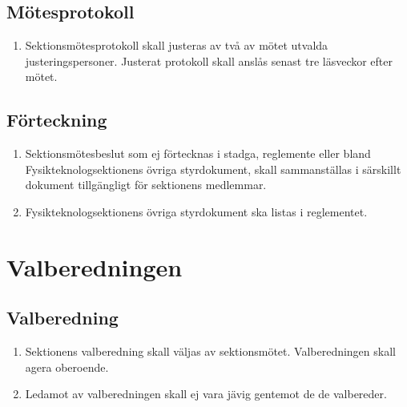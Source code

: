 \documentclass[11pt,a4paper]{article}
\begin{document}
\subsection{Mötesprotokoll}

\begin{enumerate}[\thesubsection.1]

  \item Sektionsmötesprotokoll skall justeras av två av mötet utvalda
  justeringspersoner. Justerat protokoll skall anslås senast tre
  läsveckor efter mötet.

\end{enumerate}


\subsection{Förteckning}

\begin{enumerate}[\thesubsection.1]

  \item Sektionsmötesbeslut som ej förtecknas i stadga, reglemente eller bland Fysikteknologsektionens övriga styrdokument, skall sammanställas i särskillt dokument tillgängligt för sektionens medlemmar.

\item Fysikteknologsektionens övriga styrdokument ska listas i reglementet.
\end{enumerate}

\newpage



\section{Valberedningen}

\subsection{Valberedning}

\begin{enumerate}[\thesubsection.1]

  \item Sektionens valberedning skall väljas av sektionsmötet. Valberedningen skall agera oberoende.
  
  \item Ledamot av valberedningen skall ej vara jävig gentemot de de valbereder.

\end{enumerate}
\end{document}
